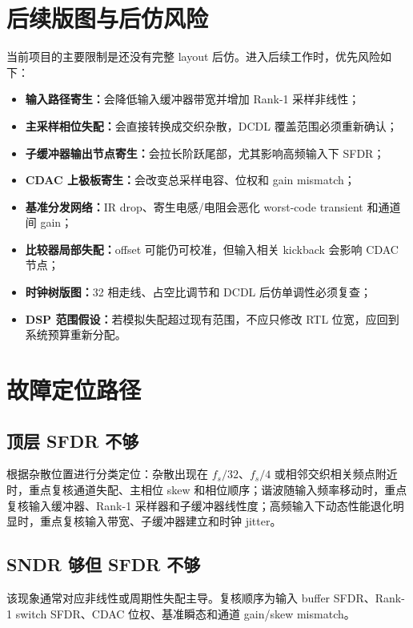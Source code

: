 \documentclass[UTF8,zihao=-4]{ctexart}
\begin{document}
\section{后续版图与后仿风险}

当前项目的主要限制是还没有完整 layout 后仿。进入后续工作时，优先风险如下：
\begin{itemize}
  \item \textbf{输入路径寄生：}会降低输入缓冲器带宽并增加 Rank-1 采样非线性；
  \item \textbf{主采样相位失配：}会直接转换成交织杂散，DCDL 覆盖范围必须重新确认；
  \item \textbf{子缓冲器输出节点寄生：}会拉长阶跃尾部，尤其影响高频输入下 SFDR；
  \item \textbf{CDAC 上极板寄生：}会改变总采样电容、位权和 gain mismatch；
  \item \textbf{基准分发网络：}IR drop、寄生电感/电阻会恶化 worst-code transient 和通道间 gain；
  \item \textbf{比较器局部失配：}offset 可能仍可校准，但输入相关 kickback 会影响 CDAC 节点；
  \item \textbf{时钟树版图：}32 相走线、占空比调节和 DCDL 后仿单调性必须复查；
  \item \textbf{DSP 范围假设：}若模拟失配超过现有范围，不应只修改 RTL 位宽，应回到系统预算重新分配。
\end{itemize}

\section{故障定位路径}

\subsection{顶层 SFDR 不够}

根据杂散位置进行分类定位：杂散出现在 \(f_s/32\)、\(f_s/4\) 或相邻交织相关频点附近时，重点复核通道失配、主相位 skew 和相位顺序；谐波随输入频率移动时，重点复核输入缓冲器、Rank-1 采样器和子缓冲器线性度；高频输入下动态性能退化明显时，重点复核输入带宽、子缓冲器建立和时钟 jitter。

\subsection{SNDR 够但 SFDR 不够}

该现象通常对应非线性或周期性失配主导。复核顺序为输入 buffer SFDR、Rank-1 switch SFDR、CDAC 位权、基准瞬态和通道 gain/skew mismatch。
\end{document}
